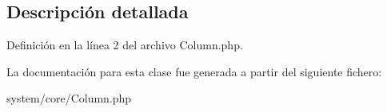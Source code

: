 \subsection{Descripción detallada}


Definición en la línea 2 del archivo Column.\+php.



La documentación para esta clase fue generada a partir del siguiente fichero\+:\begin{DoxyCompactItemize}
\item 
system/core/Column.\+php\end{DoxyCompactItemize}

